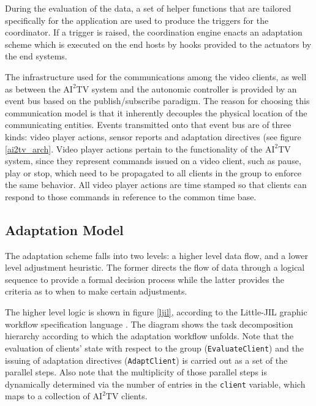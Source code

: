 \documentclass{sig-alternate}
\begin{document}
During the evaluation of the data, a set of helper functions that are
tailored specifically for the application are used to produce the
triggers for the coordinator.  If a trigger is raised, the
coordination engine enacts an adaptation scheme which is executed on
the end hosts by hooks provided to the actuators by the end systems.

The infrastructure used for the communications among the video
clients, as well as between the $\mathrm{AI}^2$TV system and the
autonomic controller is provided by an event bus based on the
publish/subscribe paradigm.  The reason for choosing this
communication model is that it inherently decouples the physical
location of the communicating entities.  Events transmitted onto that
event bus are of three kinds: video player actions, sensor reports and
adaptation directives (see figure \ref{ai2tv_arch}.  Video player
actions pertain to the functionality of the $\mathrm{AI}^2$TV system,
since they represent commands issued on a video client, such as pause,
play or stop, which need to be propagated to all clients in the group
to enforce the same behavior.  All video player actions are time
stamped so that clients can respond to those commands in reference to
the common time base.

\subsection{Adaptation Model}

The adaptation scheme falls into two levels: a higher level data flow,
and a lower level adjustment heuristic.  The former directs the flow
of data through a logical sequence to provide a formal decision
process while the latter provides the criteria as to when to make
certain adjustments.

The higher level logic is shown in figure \ref{ljil}, according to the
Little-JIL graphic workflow specification language \cite{LJIL}.  The
diagram shows the task decomposition hierarchy according to which the
adaptation workflow unfolds.  Note that the evaluation of clients'
state with respect to the group (\texttt{EvaluateClient}) and the
issuing of adaptation directives (\texttt{AdaptClient}) is carried out
as a set of the parallel steps.  Also note that the multiplicity of
those parallel steps is dynamically determined via the number of
entries in the \texttt{client} variable, which maps to a collection of
$\mathrm{AI}^2$TV clients.

%
%
\end{document}
